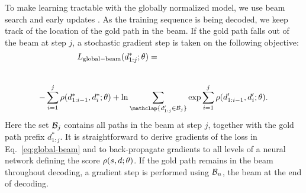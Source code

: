 To make learning tractable with the globally normalized model, 
we use beam search and early updates
\cite{collins-roark:2004:ACL,zhou-etAl:2015:ACL}.
As the training sequence is being decoded, we keep track of
the location of the gold path in the beam. If the gold path
falls out of the beam at step $j$, a stochastic gradient
step is taken on the following objective:
\[
\hspace*{-3.0cm}  L_\mathrm{global-beam}(d_{1:j}^*;\theta) = \\
  \]\\[-1cm]
\begin{equation}
\small
\hspace*{-0.2cm}  - \sum_{i=1}^j \score(d_{1:i-1}^*,d_i^* \xt) 
  + \ln \sum_{\mathclap{d'_{1:j}\in {\cal B}_j}}
  \exp \sum_{i=1}^j \score(d_{1:i-1}',d'_i \xt) . \hspace*{-0.2cm}
\label{eq:global-beam}
\end{equation}
Here the set ${\cal B}_j$ contains all paths in the beam at
step $j$, together with the gold path prefix $d^*_{1:j}$.
It is straightforward to derive gradients of the loss 
in Eq.~\eqref{eq:global-beam} and to back-propagate gradients to all
levels of a neural network defining the score $\rho(s, d; \theta)$.
If the gold path remains in the beam throughout decoding, a gradient
step is performed using ${\cal B}_n$, the beam at the end of decoding.
